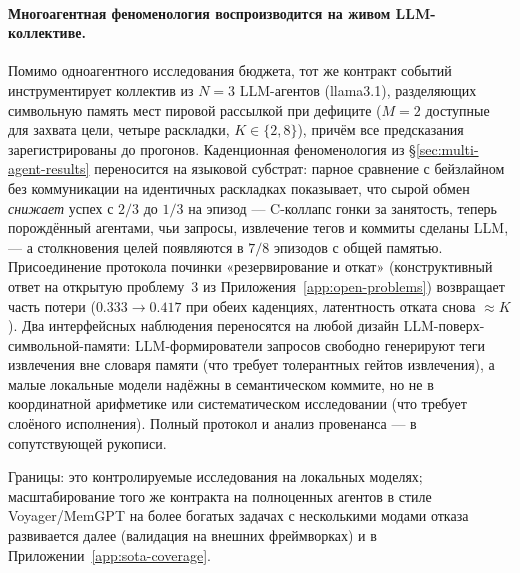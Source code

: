 \documentclass{article}
\begin{document}
\paragraph{Многоагентная феноменология воспроизводится на живом LLM-коллективе.}
Помимо одноагентного исследования бюджета, тот же контракт событий
инструментирует коллектив из $N{=}3$ LLM-агентов (llama3.1), разделяющих
символьную память мест пировой рассылкой при дефиците ($M{=}2$
доступные для захвата цели, четыре раскладки, $K\in\{2,8\}$), причём все предсказания
зарегистрированы до прогонов. Каденционная феноменология из
\S\ref{sec:multi-agent-results} переносится на языковой
субстрат: парное сравнение с бейзлайном без коммуникации
на идентичных раскладках показывает, что сырой обмен \emph{снижает} успех с
$2/3$ до $1/3$ на эпизод --- C-коллапс гонки за занятость, теперь
порождённый агентами, чьи запросы, извлечение тегов и коммиты
сделаны LLM, --- а столкновения целей появляются в $7/8$ эпизодов с общей
памятью. Присоединение протокола починки «резервирование и откат»
(конструктивный ответ на открытую проблему~3 из
Приложения~\ref{app:open-problems}) возвращает часть потери
($0.333\to0.417$ при обеих каденциях, латентность отката снова
${\approx}K$). Два интерфейсных наблюдения переносятся на любой
дизайн LLM-поверх-символьной-памяти: LLM-формирователи запросов свободно генерируют
теги извлечения вне словаря памяти (что требует толерантных
гейтов извлечения), а малые локальные модели надёжны в семантическом
коммите, но не в координатной арифметике или систематическом исследовании
(что требует слоёного исполнения). Полный протокол и анализ провенанса ---
в сопутствующей рукописи.

Границы: это контролируемые исследования на локальных моделях; масштабирование того же контракта на полноценных агентов в стиле Voyager/MemGPT на более богатых задачах с несколькими модами отказа развивается далее (валидация на внешних фреймворках) и в Приложении~\ref{app:sota-coverage}.
\end{document}
